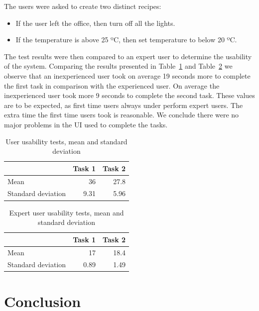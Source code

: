 \documentclass[conference]{IEEEtran}
\begin{document}
The users were asked to create two distinct recipes:

\begin{itemize}
  \item If the user left the office, then turn off all the lights.
  \item If the temperature is above 25 ºC, then set temperature to below 20 ºC. 
\end{itemize} 

The test results were then compared to an expert user to determine the usability of the system. Comparing the results presented in Table~\ref{eval:automation2} and Table~\ref{eval:automation3} we observe that an inexperienced user took on average 19 seconds more to complete the first task in comparison with the experienced user. On average the inexperienced user took more 9 seconds to complete the second task. These values are to be expected, as first time users always under perform expert users. The extra time the first time users took is reasonable. We conclude there were no major problems in the \ac{UI} used to complete the tasks.

\begin{table}[h]
\centering
\begin{tabular}{l|r|r|}
\cline{2-3}
 & \multicolumn{1}{l|}{Task 1} & \multicolumn{1}{l|}{Task 2} \\ \hline
\multicolumn{1}{|l|}{Mean} & 36 & 27.8 \\ \hline
\multicolumn{1}{|l|}{Standard deviation} & 9.31 & 5.96 \\ \hline
\end{tabular}
\caption{User usability tests, mean and standard deviation}
\label{eval:automation2}
\end{table}


\begin{table}[h]
\centering
\begin{tabular}{l|r|r|}
\cline{2-3}
 & \multicolumn{1}{l|}{Task 1} & \multicolumn{1}{l|}{Task 2} \\ \hline
\multicolumn{1}{|l|}{Mean} & 17 & 18.4 \\ \hline
\multicolumn{1}{|l|}{Standard deviation} & 0.89 & 1.49 \\ \hline
\end{tabular}
\caption{Expert user usability tests, mean and standard deviation}
\label{eval:automation3}
\end{table}



\section*{Conclusion}
\end{document}
